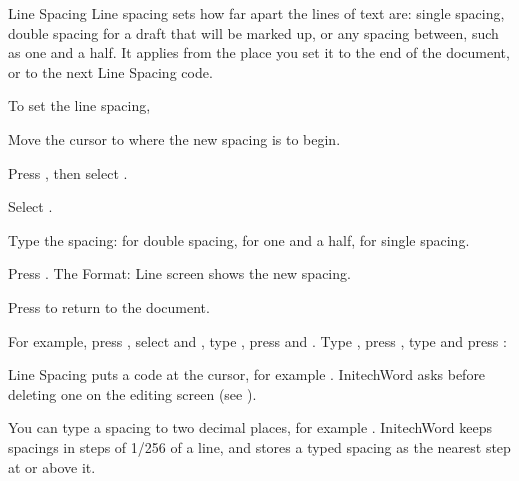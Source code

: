\begin{Feature}{Line Spacing}
Line spacing sets how far apart the lines of text are: single spacing,
double spacing for a draft that will be marked up, or any spacing between,
such as one and a half.  It applies from the place you set it to the end of
the document, or to the next Line Spacing code.

To set the line spacing,
\begin{WPSteps}
\item Move the cursor to where the new spacing is to begin.
\item Press , then select .
\item Select .
\item Type the spacing:  for double spacing,  for one and
a half,  for single spacing.
\item Press .  The Format: Line screen shows the new spacing.
\item Press  to return to the document.
\end{WPSteps}

For example, press , select  and
, type , press  and
.  Type , press
, type  and press :
\EndReplay

\Notes
{}
Line Spacing puts a  code at the cursor, for
example \Code{[Ln Spacing:2]}.  InitechWord asks before deleting one on the
editing screen (see ).

You can type a spacing to two decimal places, for example .
InitechWord keeps spacings in steps of 1/256 of a line, and stores a typed
spacing as the nearest step at or above it.


\end{Feature}
